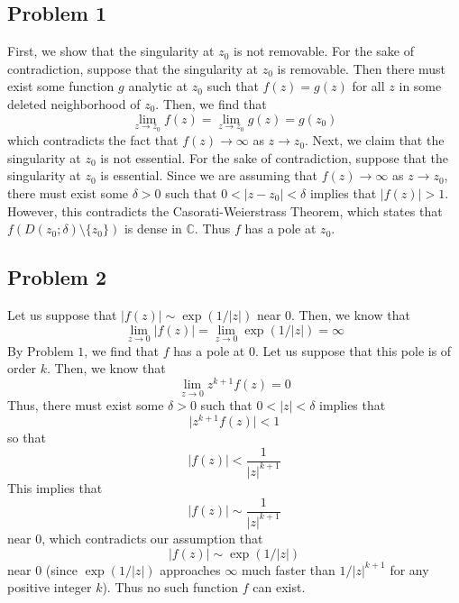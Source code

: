 \documentclass[12pt]{article}
\newcommand{\cc}{{\mathbb C}}
\begin{document}
\subsection*{Problem 1}
First, we show that the singularity at $z_0$ is not removable. For the sake of contradiction, suppose that the singularity at $z_0$ is removable. Then there must exist some function $g$ analytic at $z_0$ such that $f(z) = g(z)$ for all $z$ in some deleted neighborhood of $z_0$. Then, we find that
\[
\lim_{z \rightarrow z_0} f(z) = \lim_{z \rightarrow z_0} g(z) = g(z_0)
\] which contradicts the fact that $f(z) \rightarrow \infty$ as $z \rightarrow z_0$. Next, we claim that the singularity at $z_0$ is not essential. For the sake of contradiction, suppose that the singularity at $z_0$ is essential. Since we are assuming that $f(z) \rightarrow \infty$ as $z \rightarrow z_0$, there must exist some $\delta > 0$ such that $0 < \vert z - z_0 \vert < \delta$ implies that $\vert f(z) \vert > 1$. However, this contradicts the Casorati-Weierstrass Theorem, which states that $f(D(z_0;\delta)\setminus \{z_0\})$ is dense in $\cc$. Thus $f$ has a pole at $z_0$.
\newpage
\subsection*{Problem 2}
Let us suppose that $\vert f(z) \vert \sim \exp(1/\vert z \vert)$ near $0$. Then, we know that
\[
\lim_{z\rightarrow 0} \vert f(z) \vert = \lim_{z\rightarrow 0} \exp(1/\vert z \vert) = \infty
\] By Problem $1$, we find that $f$ has a pole at $0$. Let us suppose that this pole is of order $k$. Then, we know that
\[
\lim_{z \rightarrow 0} z^{k+1} f(z) = 0
\] Thus, there must exist some $\delta > 0$ such that $0<\vert z\vert < \delta$ implies that
\[
\vert z^{k+1} f(z) \vert < 1
\] so that
\[
\vert f(z) \vert < \frac{1}{\vert z \vert ^{k+1}}
\] This implies that 
\[
\vert f(z) \vert \sim \frac{1}{\vert z \vert^{k+1}}
\] near $0$, which contradicts our assumption that
\[
\vert f(z) \vert \sim \exp(1/\vert z \vert)
\] near $0$ (since $\exp(1/\vert z\vert)$ approaches $\infty$ much faster than $1/\vert z \vert^{k+1}$ for any positive integer $k$). Thus no such function $f$ can exist.
\newpage
\end{document}
